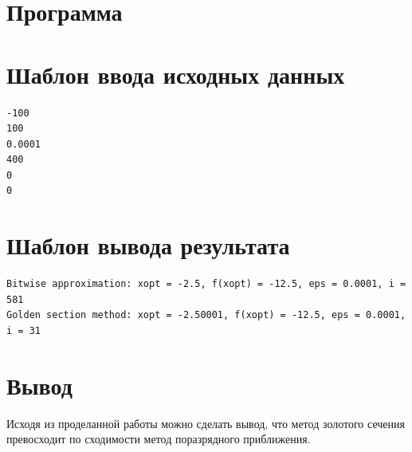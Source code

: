 \documentclass[a4paper]{article}
\begin{document}
\section{Программа}
{
\fontsize{12pt}{14pt}
\selectfont

}

\section{Шаблон ввода исходных данных}
{
\fontsize{12pt}{14pt}
\selectfont
\begin{verbatim}
-100
100
0.0001
400
0
0
\end{verbatim}
}

\section{Шаблон вывода результата}
{
\fontsize{12pt}{14pt}
\selectfont
\begin{verbatim}
Bitwise approximation: xopt = -2.5, f(xopt) = -12.5, eps = 0.0001, i = 581
Golden section method: xopt = -2.50001, f(xopt) = -12.5, eps = 0.0001, i = 31
\end{verbatim}
}

\section{Вывод}
Исходя из проделанной работы можно сделать вывод, что метод золотого сечения
превосходит по сходимости метод поразрядного приближения.
\end{document}
